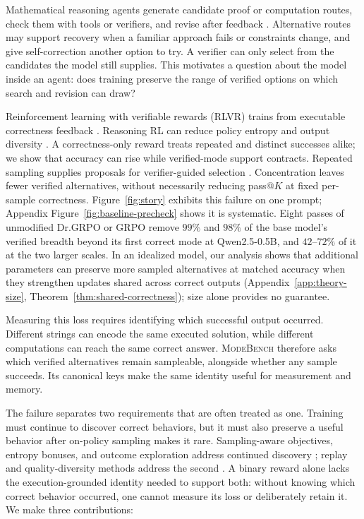 \documentclass{article}
\newcommand{\1}{\mathbf 1}
\newcommand{\mb}{\textsc{ModeBench}}
\theoremstyle{remark}
\theoremstyle{definition}
\theoremstyle{plain}
\begin{document}
Mathematical reasoning agents generate candidate proof or computation routes,
check them with tools or verifiers, and revise after feedback
\citep{brown2024monkeys,snell2024testtime}. Alternative routes may support
recovery when a familiar approach fails or constraints change, and give
self-correction another option to try. A verifier can only select from the
candidates the model still supplies. This motivates a question about the model
inside an agent: does training preserve the range of verified options on which
search and revision can draw?

Reinforcement learning with verifiable rewards (RLVR) trains from executable
correctness feedback \citep{guo2025deepseekr1}. Reasoning RL can reduce policy
entropy and output diversity \citep{cui2025entropy,dang2025diversity}.
A correctness-only reward treats repeated and distinct successes alike; we
show that accuracy can rise while verified-mode support contracts.
Repeated sampling supplies proposals for verifier-guided selection
\citep{brown2024monkeys,snell2024testtime,cobbe2021training,lightman2023lets}.
Concentration leaves fewer verified alternatives, without necessarily reducing
pass@$K$ at fixed per-sample correctness.
Figure~\ref{fig:story} exhibits this failure on one prompt;
Appendix Figure~\ref{fig:baseline-precheck} shows it is systematic. Eight passes of
unmodified Dr.GRPO or GRPO remove $99\%$ and $98\%$ of the base model's
verified breadth beyond its first correct mode at Qwen2.5-0.5B, and
$42$--$72\%$ of it at the two larger scales.
In an idealized model, our analysis shows that additional parameters can
preserve more sampled alternatives at matched accuracy when they strengthen
updates shared across correct outputs
(Appendix~\ref{app:theory-size}, Theorem~\ref{thm:shared-correctness});
size alone provides no guarantee.

Measuring this loss requires identifying which successful output occurred.
Different strings can encode the same executed solution, while different
computations can reach the same correct answer. \mb{} therefore asks which
verified alternatives remain sampleable, alongside whether any sample succeeds.
Its canonical keys make the same identity useful for measurement and memory.

The failure separates two requirements that are often treated as one. Training
must continue to discover correct behaviors, but it must also preserve a useful
behavior after on-policy sampling makes it rare. Sampling-aware objectives,
entropy bonuses, and outcome exploration address continued discovery
\citep{cheng2025exploration,song2025outcome,chen2025passktraining}; replay and
quality-diversity methods address the second
\citep{lin1992selfimproving,mnih2015human,ecoffet2021return,
mouret2015illuminating}. A binary reward alone lacks the execution-grounded identity needed to
support both: without knowing which correct behavior occurred, one cannot
measure its loss or deliberately retain it. We make three contributions:
\end{document}
